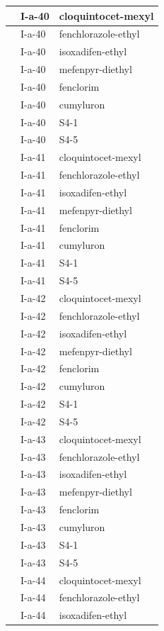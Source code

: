 \documentclass[11pt,a4paper]{article}
\begin{document}
\begin{table}[h]
\begin{tabular}{|l|l|l|}
 & I-a-40 & cloquintocet-mexyl \\ \hline
 & I-a-40 & fenchlorazole-ethyl \\ \hline
 & I-a-40 & isoxadifen-ethyl \\ \hline
 & I-a-40 & mefenpyr-diethyl \\ \hline
 & I-a-40 & fenclorim \\ \hline
 & I-a-40 & cumyluron \\ \hline
 & I-a-40 & S4-1 \\ \hline
 & I-a-40 & S4-5 \\ \hline
 & I-a-41 & cloquintocet-mexyl \\ \hline
 & I-a-41 & fenchlorazole-ethyl \\ \hline
 & I-a-41 & isoxadifen-ethyl \\ \hline
 & I-a-41 & mefenpyr-diethyl \\ \hline
 & I-a-41 & fenclorim \\ \hline
 & I-a-41 & cumyluron \\ \hline
 & I-a-41 & S4-1 \\ \hline
 & I-a-41 & S4-5 \\ \hline
 & I-a-42 & cloquintocet-mexyl \\ \hline
 & I-a-42 & fenchlorazole-ethyl \\ \hline
 & I-a-42 & isoxadifen-ethyl \\ \hline
 & I-a-42 & mefenpyr-diethyl \\ \hline
 & I-a-42 & fenclorim \\ \hline
 & I-a-42 & cumyluron \\ \hline
 & I-a-42 & S4-1 \\ \hline
 & I-a-42 & S4-5 \\ \hline
 & I-a-43 & cloquintocet-mexyl \\ \hline
 & I-a-43 & fenchlorazole-ethyl \\ \hline
 & I-a-43 & isoxadifen-ethyl \\ \hline
 & I-a-43 & mefenpyr-diethyl \\ \hline
 & I-a-43 & fenclorim \\ \hline
 & I-a-43 & cumyluron \\ \hline
 & I-a-43 & S4-1 \\ \hline
 & I-a-43 & S4-5 \\ \hline
 & I-a-44 & cloquintocet-mexyl \\ \hline
 & I-a-44 & fenchlorazole-ethyl \\ \hline
 & I-a-44 & isoxadifen-ethyl \\ \hline

\end{tabular}
\end{table}
\end{document}
